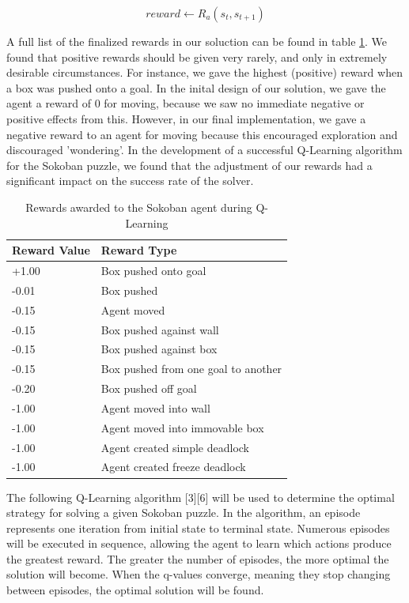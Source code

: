 \documentclass[times, 10pt,twocolumn]{article}
\begin{document}
\begin{equation}
reward \gets R_a(s_t, s_{t+1})
\label{eq:reward}
\end{equation}

A full list of the finalized rewards in our soluction can be found in table \ref{table:rewards}.  We found that positive rewards should be given very rarely, and only in extremely desirable circumstances.  For instance, we gave the highest (positive) reward when a box was pushed onto a goal.  In the inital design of our solution, we gave the agent a reward of 0 for moving, because we saw no immediate negative or positive effects from this.  However, in our final implementation, we gave a negative reward to an agent for moving because this encouraged exploration and discouraged 'wondering'.  In the development of a successful Q-Learning algorithm for the Sokoban puzzle, we found that the adjustment of our rewards had a significant impact on the success rate of the solver.

\begin{table}[htbp]
\begin{tabular}{l l} \hline\hline
Reward Value & Reward Type \\ \hline
+1.00 & Box pushed onto goal \\
-0.01 & Box pushed \\
-0.15 & Agent moved \\
-0.15 & Box pushed against wall \\
-0.15 & Box pushed against box \\
-0.15 & Box pushed from one goal to another \\
-0.20 & Box pushed off goal \\ 
-1.00 & Agent moved into wall \\
-1.00 & Agent moved into immovable box \\
-1.00 & Agent created simple deadlock \\
-1.00 & Agent created freeze deadlock \\ \hline\hline
\end{tabular}
\caption{Rewards awarded to the Sokoban agent during Q-Learning}
\label{table:rewards}
\end{table}


The following Q-Learning algorithm [3][6] will be used to determine the optimal strategy for solving a given Sokoban puzzle. In the algorithm, an episode represents one iteration from initial state to terminal state. Numerous episodes will be executed in sequence, allowing the agent to learn which actions produce the greatest reward. The greater the number of episodes, the more optimal the solution will become. When the q-values converge, meaning they stop changing between episodes, the optimal solution will be found.
\end{document}
